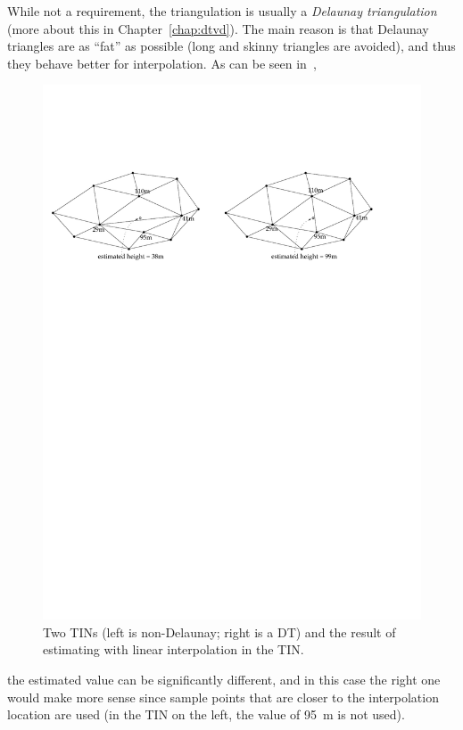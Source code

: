 While not a requirement, the triangulation is usually a \emph{Delaunay triangulation} (more about this in Chapter~\ref{chap:dtvd}).%
The main reason is that Delaunay triangles are as ``fat'' as possible (long and skinny triangles are avoided), and thus they behave better for interpolation.
As can be seen in~,
\begin{figure}
  \centering
  \includegraphics[width=\linewidth]{figs/whydt}
  \caption{Two TINs (left is non-Delaunay; right is a DT) and the result of estimating with linear interpolation in the TIN\@.}%
\end{figure}
the estimated value can be significantly different, and in this case the right one would make more sense since sample points that are closer to the interpolation location are used (in the TIN on the left, the value of \qty{95}{\m} is not used).

